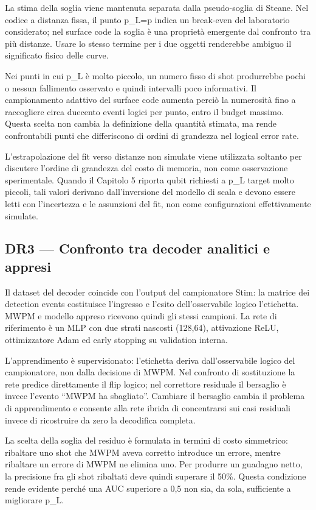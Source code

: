 La stima della soglia viene mantenuta separata dalla pseudo-soglia di Steane. Nel codice a distanza fissa, il punto p\_L=p indica un break-even del laboratorio considerato; nel surface code la soglia è una proprietà emergente dal confronto tra più distanze. Usare lo stesso termine per i due oggetti renderebbe ambiguo il significato fisico delle curve.

Nei punti in cui p\_L è molto piccolo, un numero fisso di shot produrrebbe pochi o nessun fallimento osservato e quindi intervalli poco informativi. Il campionamento adattivo del surface code aumenta perciò la numerosità fino a raccogliere circa duecento eventi logici per punto, entro il budget massimo. Questa scelta non cambia la definizione della quantità stimata, ma rende confrontabili punti che differiscono di ordini di grandezza nel logical error rate.

L'estrapolazione del fit verso distanze non simulate viene utilizzata soltanto per discutere l'ordine di grandezza del costo di memoria, non come osservazione sperimentale. Quando il Capitolo 5 riporta qubit richiesti a p\_L target molto piccoli, tali valori derivano dall'inversione del modello di scala e devono essere letti con l'incertezza e le assunzioni del fit, non come configurazioni effettivamente simulate.

\subsection{DR3 --- Confronto tra decoder analitici e appresi}\label{sec:finale_3_5_4}

Il dataset del decoder coincide con l'output del campionatore Stim: la matrice dei detection events costituisce l'ingresso e l'esito dell'osservabile logico l'etichetta. MWPM e modello appreso ricevono quindi gli stessi campioni. La rete di riferimento è un MLP con due strati nascosti (128,64), attivazione ReLU, ottimizzatore Adam ed early stopping su validation interna.

L'apprendimento è supervisionato: l'etichetta deriva dall'osservabile logico del campionatore, non dalla decisione di MWPM. Nel confronto di sostituzione la rete predice direttamente il flip logico; nel correttore residuale il bersaglio è invece l'evento ``MWPM ha sbagliato''. Cambiare il bersaglio cambia il problema di apprendimento e consente alla rete ibrida di concentrarsi sui casi residuali invece di ricostruire da zero la decodifica completa.

La scelta della soglia del residuo è formulata in termini di costo simmetrico: ribaltare uno shot che MWPM aveva corretto introduce un errore, mentre ribaltare un errore di MWPM ne elimina uno. Per produrre un guadagno netto, la precisione fra gli shot ribaltati deve quindi superare il 50\%. Questa condizione rende evidente perché una AUC superiore a 0,5 non sia, da sola, sufficiente a migliorare p\_L.

